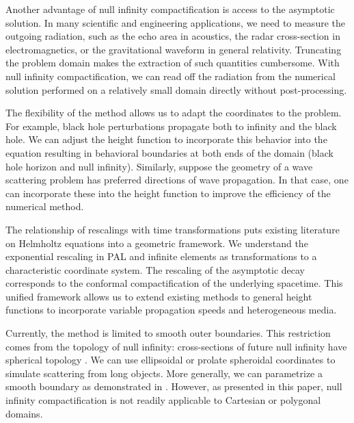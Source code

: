 \documentclass[final,onefignum,onetabnum]{siamart190516}
\begin{document}
Another advantage of null infinity compactification is access to the asymptotic solution. In many scientific and engineering applications, we need to measure the outgoing radiation, such as the echo area in acoustics, the radar cross-section in electromagnetics, or the gravitational waveform in general relativity. Truncating the problem domain makes the extraction of such quantities cumbersome. With null infinity compactification, we can read off the radiation from the numerical solution performed on a relatively small domain directly without post-processing. %

The flexibility of the method allows us to adapt the coordinates to the problem. For example, black hole perturbations propagate both to infinity and the black hole. We can adjust the height function to incorporate this behavior into the equation resulting in behavioral boundaries at both ends of the domain (black hole horizon and null infinity)\cite{ZengFramework}. Similarly, suppose the geometry of a wave scattering problem has preferred directions of wave propagation. In that case, one can incorporate these into the height function to improve the efficiency of the numerical method.


The relationship of rescalings with time transformations puts existing literature on Helmholtz equations into a geometric framework. We understand the exponential rescaling in PAL and infinite elements as transformations to a characteristic coordinate system. The rescaling of the asymptotic decay corresponds to the conformal compactification of the underlying spacetime. This unified framework allows us to extend existing methods to general height functions to incorporate variable propagation speeds and heterogeneous media.
 
Currently, the method is limited to smooth outer boundaries. This restriction comes from the topology of null infinity: cross-sections of future null infinity have spherical topology \cite{Penrose65, Geroch}. We can use ellipsoidal or prolate spheroidal coordinates to simulate scattering from long objects. More generally, we can parametrize a smooth boundary as demonstrated in \cite{yang2021truly}. However, as presented in this paper, null infinity compactification is not readily applicable to Cartesian or polygonal domains.
\end{document}
